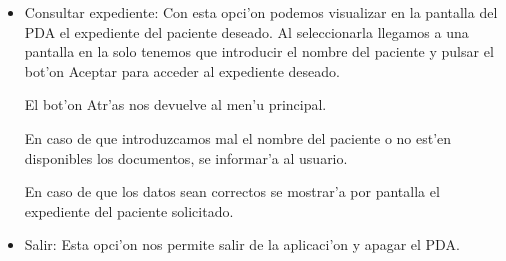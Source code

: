 \begin{enumerate}
\begin{itemize}
\item Consultar expediente:\newline
Con esta opci'on podemos visualizar en la pantalla del PDA el expediente del paciente deseado. Al seleccionarla llegamos a  una pantalla en la solo tenemos que introducir el nombre del paciente y pulsar el bot'on Aceptar para acceder al expediente deseado.


El bot'on Atr'as nos devuelve al men'u principal.

En caso de que introduzcamos mal el nombre del paciente o no est'en disponibles los documentos, se informar'a al usuario.


En caso de que los datos sean correctos se mostrar'a por pantalla el expediente del paciente solicitado.


\item Salir:\newline
Esta opci'on nos permite salir de la aplicaci'on y apagar el PDA.
 
\end{itemize}


\end{enumerate}
